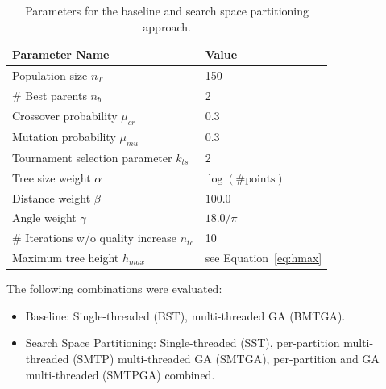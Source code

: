 \begin{table}[h]
	\centering
	\begin{tabular}{|l|l|}
		\hline
		\textbf{Parameter Name} & \textbf{Value}  \\
		\hline
		Population size $n_T$ & 150 \\
		\hline
		\# Best parents $n_b$ & 2 \\
		\hline
		Crossover probability $\mu_{cr}$& 0.3 \\
		\hline
		Mutation probability $\mu_{mu}$& 0.3 \\
		\hline
		Tournament selection parameter $k_{ts}$ & 2\\
		\hline
		Tree size weight $\alpha$& $\log(\text{\#points})$\\
		\hline
		Distance weight $\beta$& $100.0$ \\
		\hline
		Angle weight $\gamma$& $18.0/\pi$ \\
		\hline 
		\# Iterations w/o quality increase $n_{tc}$ & 10 \\
		\hline 
		Maximum tree height $h_{max}$ & see Equation~\ref{eq:hmax} \\
		\hline 
	\end{tabular}
	\caption{Parameters for the baseline and search space partitioning approach.}
	\label{tab:gaparams}
\end{table}
The following combinations were evaluated:
\begin{itemize}
	\item Baseline: Single-threaded (BST), multi-threaded \ac{GA} (BMTGA).
	\item Search Space Partitioning: Single-threaded (SST), per-partition multi-threaded (SMTP) multi-threaded \ac{GA} (SMTGA), per-partition and \ac{GA} multi-threaded (SMTPGA) combined.
\end{itemize}   
